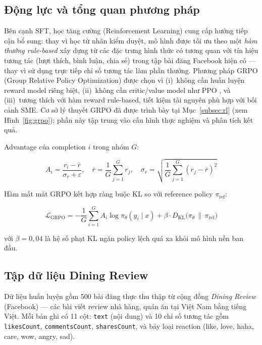 \subsection{Động lực và tổng quan phương pháp}

Bên cạnh SFT, học tăng cường (Reinforcement Learning) cung cấp hướng
tiếp cận bổ sung: thay vì học từ nhãn kiểm duyệt, mô hình được tối ưu
theo một \emph{hàm thưởng rule-based} xây dựng từ các đặc trưng hình
thức có tương quan với tín hiệu tương tác (lượt thích, bình luận, chia
sẻ) trong tập bài đăng Facebook hiện có --- thay vì sử dụng trực tiếp
chỉ số tương tác làm phần thưởng. Phương pháp GRPO (Group Relative
Policy Optimization)  được chọn vì (i)~không cần
huấn luyện reward
model riêng biệt, (ii)~không cần critic/value model như PPO
, và
(iii)~tương thích với hàm reward rule-based, tiết kiệm tài nguyên phù
hợp với bối cảnh SME. Cơ sở lý thuyết GRPO đã được trình
bày tại Mục~\ref{subsec:rl} (xem Hình~\ref{fig:grpo}); phần này tập
trung vào cấu hình thực nghiệm và phân tích kết quả.

Advantage của completion $i$ trong nhóm $G$:

\begin{equation}
  A_i = \frac{r_i - \bar{r}}{\sigma_r + \varepsilon}, \quad
  \bar{r} = \frac{1}{G}\sum_{j=1}^{G} r_j, \quad
  \sigma_r = \sqrt{\frac{1}{G}\sum_{j=1}^{G}(r_j - \bar{r})^2}
  \label{eq:grpo-advantage}
\end{equation}

Hàm mất mát GRPO kết hợp ràng buộc KL so với reference policy
$\pi_{\text{ref}}$:

\begin{equation}
  \mathcal{L}_{\text{GRPO}}
    = -\frac{1}{G}\sum_{i=1}^{G} A_i \log \pi_\theta(y_i \mid x)
    + \beta \cdot D_{\text{KL}}\!\bigl(\pi_\theta \,\|\, \pi_{\text{ref}}\bigr)
  \label{eq:grpo-loss}
\end{equation}

với $\beta = 0{,}04$ là hệ số phạt KL ngăn policy lệch quá xa khỏi
mô hình nền ban đầu.

\subsection{Tập dữ liệu Dining Review}

Dữ liệu huấn luyện gồm 500 bài đăng thực thu thập từ cộng đồng
\emph{Dining Review} (Facebook) --- các bài viết review nhà hàng,
quán ăn tại Việt Nam bằng tiếng Việt. Mỗi bản ghi có 11 cột:
\texttt{text} (nội dung) và 10 chỉ số tương tác gồm
\texttt{likesCount}, \texttt{commentsCount}, \texttt{sharesCount},
và bảy loại reaction (like, love, haha, care, wow, angry, sad).

